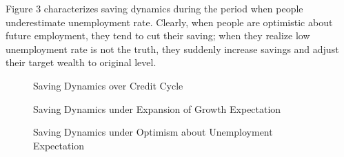 \documentclass[titlepage,abstract,letterpaper]{econtex}
\begin{document}
\begin{enumerate}
Figure 3 characterizes saving dynamics during the period when people underestimate unemployment rate. Clearly, when people are optimistic about future employment, they tend to cut their saving; when they realize low unemployment rate is not the truth, they suddenly increase savings and adjust their target wealth to original level.
\end{enumerate}


\begin{figure}
\caption{Saving Dynamics over Credit Cycle}

\caption{Saving Dynamics under Expansion of Growth Expectation}
\end{figure}
\begin{figure}
\caption{Saving Dynamics under Optimism about Unemployment Expectation}
\end{figure}


\end{document}
